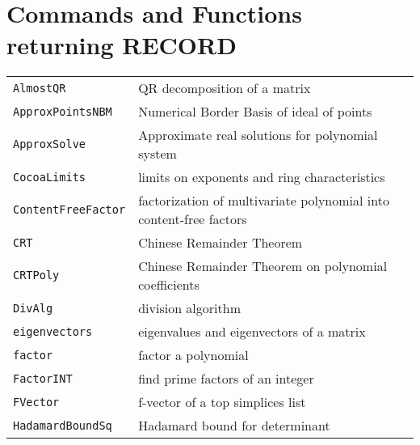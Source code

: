 \documentclass[a4paper]{mybook}
\begin{document}
\noindent



\section{Commands and Functions returning RECORD}
\label{Commands and Functions returning RECORD}

        

\begin{center}
\begin{longtable}{ll}
   
{\verb~AlmostQR~} &
      QR decomposition of a matrix\\
   
{\verb~ApproxPointsNBM~} &
      Numerical Border Basis of ideal of points\\
   
{\verb~ApproxSolve~} &
      Approximate real solutions for polynomial system\\
   
{\verb~CocoaLimits~} &
      limits on exponents and ring characteristics\\
   
{\verb~ContentFreeFactor~} &
      factorization of multivariate polynomial into content-free factors\\
   
{\verb~CRT~} &
      Chinese Remainder Theorem\\
   
{\verb~CRTPoly~} &
      Chinese Remainder Theorem on polynomial coefficients\\
   
{\verb~DivAlg~} &
      division algorithm\\
   
{\verb~eigenvectors~} &
      eigenvalues and eigenvectors of a matrix\\
   
{\verb~factor~} &
      factor a polynomial\\
   
{\verb~FactorINT~} &
      find prime factors of an integer\\
   
{\verb~FVector~} &
      f-vector of a top simplices list\\
   
{\verb~HadamardBoundSq~} &
      Hadamard bound for determinant\\
   

\end{longtable}
\end{center}
\end{document}
